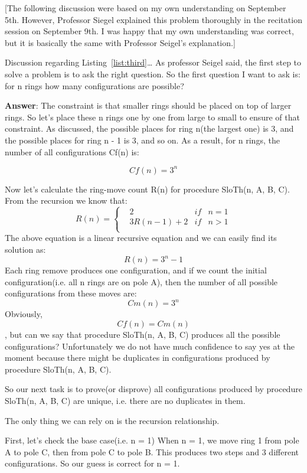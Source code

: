 \documentclass[a4paper,11pt]{article}
\theoremstyle{mytheor}
\begin{document}
[The following discussion were based on my own understanding on September 5th. However, Professor Siegel explained this problem thoroughly in the recitation session on September 9th. I was happy that my own understanding was correct, but it is basically the same with Professor Seigel's explanation.]

Discussion regarding Listing~\ref{list:third}\ldots{} 
As professor Seigel said, the first step to solve a problem is to ask the right question. So the first question I want to ask is: for n rings how many configurations are possible?

\textbf{Answer}: The constraint is that smaller rings should be placed on top of larger rings. So let's place these n rings one by one from large to small to ensure of that constraint. As discussed, the possible places for ring n(the largest one) is 3, and the possible places for ring n - 1 is 3, and so on. As a result, for n rings, the number of all configurations Cf(n) is:

$$Cf(n) = 3^{n}$$

Now let's calculate the ring-move count R(n) for procedure SloTh(n, A, B, C).
From the recursion we know that:
$$R(n)=\left\{
\begin{aligned}
&2  & if &  n = 1 \\
&3R(n-1) + 2  & if &  n > 1 \\
\end{aligned}
\right.
$$
The above equation is a linear recursive equation and we can easily find its solution as:
$$
R(n) = 3^{n} - 1
$$
Each ring remove produces one configuration, and if we count the initial configuration(i.e. all n rings are on pole A), then the number of all possible configurations from these moves are:
$$
Cm(n) = 3^{n}
$$
Obviously, $$Cf(n) = Cm(n)$$, but can we say that procedure SloTh(n, A, B, C) produces all the possible configurations? Unfortunately we do not have much confidence to say yes at the moment because there might be duplicates in configurations produced by procedure SloTh(n, A, B, C).

So our next task is to prove(or disprove) all configurations produced by procedure SloTh(n, A, B, C) are unique, i.e. there are no duplicates in them.

The only thing we can rely on is the recursion relationship.

First, let's check the base case(i.e. n = 1)
When n = 1, we move ring 1 from pole A to pole C, then from pole C to pole B. This produces two steps and 3 different configurations. So our guess is correct for n = 1.
\end{document}
